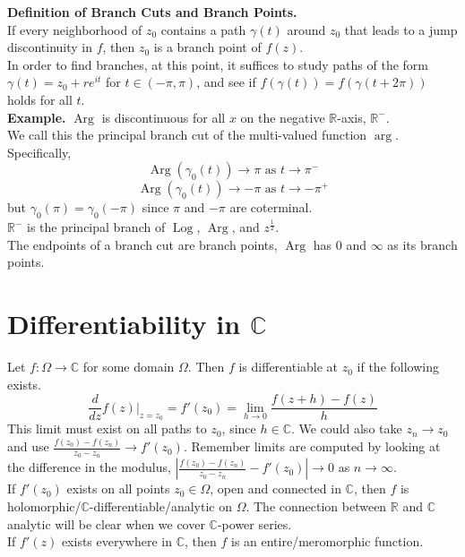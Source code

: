 \documentclass[11pt]{article}
\begin{document}
\textbf{Definition of Branch Cuts and Branch Points.}\\
If every neighborhood of $z_0$ contains a path $\gamma(t)$ around $z_0$ that leads to a jump discontinuity in $f$, then $z_0$ is a branch point of $f(z)$. \\ 
In order to find branches, at this point, it suffices to study paths of the form $\gamma(t) = z_0 + re^{it}$ for $t \in (-\pi, \pi)$, and see if $f(\gamma(t)) = f(\gamma(t + 2\pi))$ holds for all $t$. \\
\newline
\textbf{Example.} $\operatorname{Arg}$ is discontinuous for all $x$ on the negative $\mathbb{R}$-axis, $\mathbb{R}^-$. \\
We call this the principal branch cut of the multi-valued function $\operatorname{arg}$. Specifically, \\
\begin{equation*} 
\operatorname{Arg}(\gamma_0(t)) \to \pi \mbox{ as } t \to \pi^- 
\end{equation*}
\begin{equation*} 
\operatorname{Arg}(\gamma_0(t)) \to -\pi \mbox{ as } t \to -\pi^+
\end{equation*} 
but $\gamma_0(\pi) = \gamma_0(-\pi)$ since $\pi$ and $-\pi$ are coterminal. \\
$\mathbb{R}^-$ is the principal branch of $\operatorname{Log}$, $\operatorname{Arg}$, and $z^{\frac{1}{2}}$. \\
The endpoints of a branch cut are branch points, $\operatorname{Arg}$ has 0 and $\infty$ as its branch points. 

\newpage
\section{Differentiability in $\mathbb{C}$}
Let $f: \Omega \to \mathbb{C}$ for some domain $\Omega$. Then $f$ is differentiable at $z_0$ if the following exists. $$\frac{d}{dz}f(z)|_{z = z_0} = f'(z_0) = \lim_{h\to0}\frac{f(z + h) - f(z)}{h}$$
This limit must exist on all paths to $z_0$, since $h \in \mathbb{C}$. We could also take $z_n \to z_0$ and use $\frac{f(z_0) - f(z_n)}{z_0 - z_n} \to f'(z_0)$. 
Remember limits are computed by looking at the difference in the modulus, $|\frac{f(z_0) - f(z_n)}{z_0 - z_n} - f'(z_0)| \to 0$ as $n \to \infty$. \\
If $f'(z_0)$ exists on all points $z_0 \in \Omega$, open and connected in $\mathbb{C}$, then $f$ is holomorphic/$\mathbb{C}$-differentiable/analytic on $\Omega$. The connection between $\mathbb{R}$ and $\mathbb{C}$ analytic will be clear when we cover $\mathbb{C}$-power series. \\
If $f'(z)$ exists everywhere in $\mathbb{C}$, then $f$ is an entire/meromorphic function.  
\end{document}
